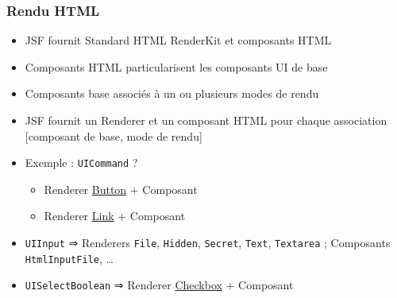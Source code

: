 \documentclass[english, french]{beamer}
\begin{document}
\begin{frame}
	\frametitle{Rendu HTML}
	\begin{itemize}
		\item JSF fournit Standard HTML RenderKit et composants HTML
		\item Composants HTML particularisent les composants UI de base
		\item Composants base associés à un ou plusieurs modes de rendu
		\item JSF fournit un Renderer et un composant HTML pour chaque association [composant de base, mode de rendu]
		\item Exemple : \texttt{UICommand} ? \pause
		\begin{itemize}
			\item Renderer \href{https://docs.oracle.com/javaee/7/javaserver-faces-2-2/renderkitdocs/HTML_BASIC/javax.faces.Commandjavax.faces.Button.html}{Button} + Composant 
			\item Renderer \href{https://docs.oracle.com/javaee/7/javaserver-faces-2-2/renderkitdocs/HTML_BASIC/javax.faces.Commandjavax.faces.Link.html}{Link} + Composant 
		\end{itemize}
		\pause
		\item \texttt{UIInput} ⇒ Renderers \texttt{File}, \texttt{Hidden}, \texttt{Secret}, \texttt{Text}, \texttt{Textarea} ; Composants \texttt{HtmlInputFile}, …
		\item \texttt{UISelectBoolean} ⇒ Renderer \href{https://docs.oracle.com/javaee/7/javaserver-faces-2-2/renderkitdocs/HTML_BASIC/javax.faces.SelectBooleanjavax.faces.Checkbox.html}{Checkbox} + Composant 
	\end{itemize}
\end{frame}
\end{document}
